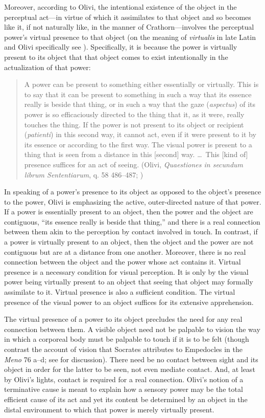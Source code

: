 Moreover, according to Olivi, the intentional existence of the object in the perceptual act---in virtue of which it assimilates to that object and so becomes like it, if not naturally like, in the manner of Crathorn---involves the perceptual power's virtual presence to that object (on the meaning of \emph{virtualis} in late Latin and Olivi specifically see \citealt[172--173]{Pasnau:1997aa}). Specifically, it is because the power is virtually present to its object that that object comes to exist intentionally in the actualization of that power: 
\begin{quote}
	A power can be present to something either essentially or virtually. This is to say that it can be present to something in such a way that its essence really is beside that thing, or in such a way that the gaze (\emph{aspectus}) of its power is so efficaciously directed to the thing that it, as it were, really touches the thing. If the power is not present to its object or recipient (\emph{patienti}) in this second way, it cannot act, even if it were present to it by its essence or according to the first way. The visual power is present to a thing that is seen from a distance in this [second] way. \dots\ This [kind of] presence suffices for an act of seeing. (Olivi, \emph{Quaestiones in secundum librum Sententiarum}, q. 58 486--487; \citealt[151--152]{Toivanen:2013ul})
\end{quote}
In speaking of a power's presence to its object as opposed to the object's presence to the power, Olivi is emphasizing the active, outer-directed nature of that power. If a power is essentially present to an object, then the power and the object are contiguous, ``its essence really is beside that thing,'' and there is a real connection between them akin to the perception by contact involved in touch. In contrast, if a power is virtually present to an object, then the object and the power are not contiguous but are at a distance from one another. Moreover, there is no real connection between the object and the power whose act contains it. Virtual presence is a necessary condition for visual perception. It is only by the visual power being virtually present to an object that seeing that object may formally assimilate to it. Virtual presence is also a sufficient condition. The virtual presence of the visual power to an object suffices for its extensive apprehension. 

The virtual presence of a power to its object precludes the need for any real connection between them. A visible object need not be palpable to vision the way in which a corporeal body must be palpable to touch if it is to be felt (though contrast the account of vision that Socrates attributes to Empedocles in the \emph{Meno} 76 a--d; see \citealt[chapter 1.2]{Kalderon:2015fr} for discussion). There need be no contact between sight and its object in order for the latter to be seen, not even mediate contact. And, at least by Olivi's lights, contact is required for a real connection. Olivi's notion of a terminative cause is meant to explain how a sensory power may be the total efficient cause of its act and yet its content be determined by an object in the distal environment to which that power is merely virtually present.

